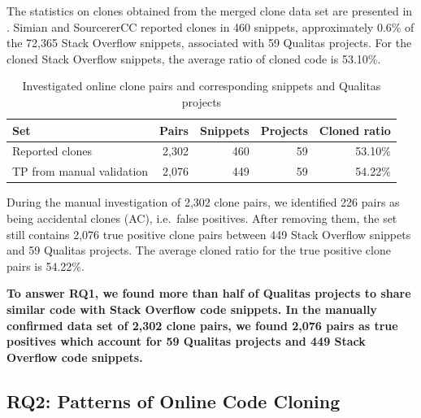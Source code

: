 \documentclass[10pt,journal,compsoc]{IEEEtran}
\newcommand\FIXME[1]{{\color{red}\textbf{FIXME: #1}}}
\begin{document}
The statistics on clones obtained from the merged clone data set are
presented in . Simian and SourcererCC
reported clones in 460 snippets, approximately 0.6\% of the
72,365 Stack Overflow snippets, associated with 59 Qualitas
projects. For the cloned Stack Overflow snippets, the
average ratio of cloned code is 53.10\%.


\begin{table}
	\caption{Investigated online clone pairs and corresponding snippets
		and Qualitas projects}
	\label{tab:snippets}
	\centering
	\begin{tabular}{p{2.2cm}rrrr}
		\toprule
		Set & Pairs & Snippets & Projects & Cloned ratio \\
		\midrule
		Reported clones & 2,302 & 460 & 59 & 53.10\% \\ 
		\midrule
		TP from manual validation & 2,076 & 449 & 59 & 54.22\% \\ 
		\bottomrule
	\end{tabular}
\end{table}

During the manual investigation of 2,302 clone pairs, we identified 226 pairs
as being accidental clones (AC), i.e.~false positives. After removing
them, the set still contains 2,076 true positive clone pairs between 449 Stack
Overflow snippets and 59 Qualitas projects. The average cloned ratio for the
true positive clone pairs is 54.22\%.

\textbf{To answer RQ1, we found more than half of Qualitas projects to share
	similar code with Stack Overflow code snippets. In the manually confirmed 
	data set of 2,302 clone pairs, we found 2,076 pairs as true positives which 
	account for 59 Qualitas projects and
	449 Stack Overflow code snippets.}

\subsection{RQ2: Patterns of Online Code Cloning}
\end{document}
